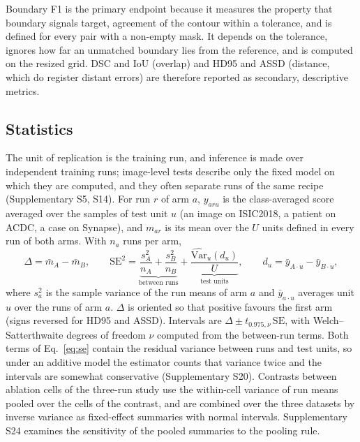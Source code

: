\documentclass[fleqn,10pt,lineno]{wlpeerj}
\begin{document}
Boundary F1 is the primary endpoint because it measures the property that boundary signals target, agreement of the contour within a tolerance, and is defined for every pair with a non-empty mask. It depends on the tolerance, ignores how far an unmatched boundary lies from the reference, and is computed on the resized grid. DSC and IoU (overlap) and HD95 and ASSD (distance, which do register distant errors) are therefore reported as secondary, descriptive metrics.

\subsection*{Statistics}
The unit of replication is the training run, and inference is made over independent training runs; image-level tests describe only the fixed model on which they are computed, and they often separate runs of the same recipe (Supplementary S5, S14). For run $r$ of arm $a$, $y_{aru}$ is the class-averaged score averaged over the samples of test unit $u$ (an image on ISIC2018, a patient on ACDC, a case on Synapse), and $m_{ar}$ is its mean over the $U$ units defined in every run of both arms. With $n_a$ runs per arm,
\begin{equation}
\Delta=\bar m_A-\bar m_B,\qquad
\mathrm{SE}^2=\underbrace{\frac{s_A^2}{n_A}+\frac{s_B^2}{n_B}}_{\text{between runs}}+\underbrace{\frac{\widehat{\mathrm{Var}}_u(d_u)}{U}}_{\text{test units}},\qquad
d_u=\bar y_{A\cdot u}-\bar y_{B\cdot u},
\label{eq:se}
\end{equation}
where $s_a^2$ is the sample variance of the run means of arm $a$ and $\bar y_{a\cdot u}$ averages unit $u$ over the runs of arm $a$. $\Delta$ is oriented so that positive favours the first arm (signs reversed for HD95 and ASSD). Intervals are $\Delta\pm t_{0.975,\nu}\,\mathrm{SE}$, with Welch--Satterthwaite degrees of freedom $\nu$ computed from the between-run terms. Both terms of Eq.~\ref{eq:se} contain the residual variance between runs and test units, so under an additive model the estimator counts that variance twice and the intervals are somewhat conservative (Supplementary S20). Contrasts between ablation cells of the three-run study use the within-cell variance of run means pooled over the cells of the contrast, and are combined over the three datasets by inverse variance as fixed-effect summaries with normal intervals. Supplementary S24 examines the sensitivity of the pooled summaries to the pooling rule.
\end{document}
